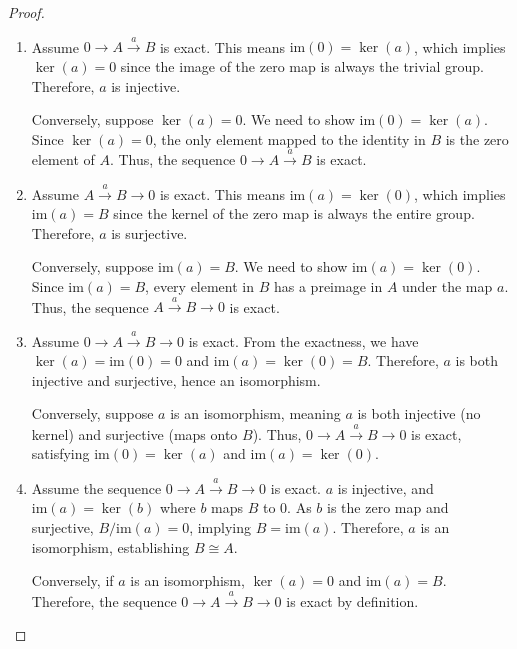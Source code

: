 \begin{proof}
\begin{enumerate}
    \item Assume \( 0 \rightarrow A \xrightarrow{a} B \) is exact. This means \(\mathrm{im}(0) = \ker(a)\), which implies \(\ker(a) = 0\) since the image of the zero map is always the trivial group. Therefore, \(a\) is injective.

    Conversely, suppose \(\ker(a) = 0\). We need to show \(\mathrm{im}(0) = \ker(a)\). Since \(\ker(a) = 0\), the only element mapped to the identity in \(B\) is the zero element of \(A\). Thus, the sequence \(0 \rightarrow A \xrightarrow{a} B\) is exact.
    
    \item Assume \( A \xrightarrow{a} B \rightarrow 0 \) is exact. This means \(\mathrm{im}(a) = \ker(0)\), which implies \(\mathrm{im}(a) = B\) since the kernel of the zero map is always the entire group. Therefore, \(a\) is surjective.

    Conversely, suppose \(\mathrm{im}(a) = B\). We need to show \(\mathrm{im}(a) = \ker(0)\). Since \(\mathrm{im}(a) = B\), every element in \(B\) has a preimage in \(A\) under the map \(a\). Thus, the sequence \( A \xrightarrow{a} B \rightarrow 0 \) is exact.

    \item Assume \( 0 \rightarrow A \xrightarrow{a} B \rightarrow 0 \) is exact. From the exactness, we have \(\ker(a) = \mathrm{im}(0) = 0\) and \(\mathrm{im}(a) = \ker(0) = B\). Therefore, \(a\) is both injective and surjective, hence an isomorphism.

    Conversely, suppose \(a\) is an isomorphism, meaning \(a\) is both injective (no kernel) and surjective (maps onto \(B\)). Thus, \( 0 \rightarrow A \xrightarrow{a} B \rightarrow 0 \) is exact, satisfying \(\mathrm{im}(0) = \ker(a)\) and \(\mathrm{im}(a) = \ker(0)\).

    \item Assume the sequence \( 0 \rightarrow A \xrightarrow{a} B \rightarrow 0 \) is exact. \(a\) is injective, and \(\mathrm{im}(a) = \ker(b)\) where \(b\) maps \(B\) to 0. As \(b\) is the zero map and surjective, \( B/\mathrm{im}(a) = 0 \), implying \( B = \mathrm{im}(a) \). Therefore, \(a\) is an isomorphism, establishing \( B \cong A \).

    Conversely, if \(a\) is an isomorphism, \(\ker(a) = 0\) and \(\mathrm{im}(a) = B\). Therefore, the sequence \( 0 \rightarrow A \xrightarrow{a} B \rightarrow 0 \) is exact by definition.
\end{enumerate}
\end{proof}

